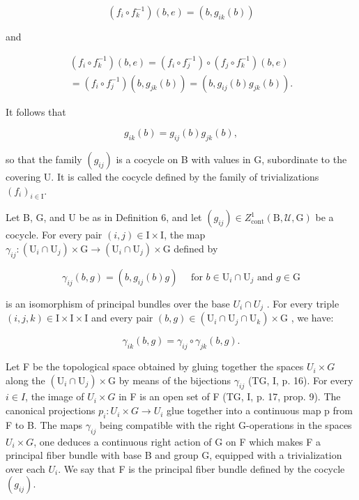 \[
(f _ {i} \circ f _ {k} ^ {- 1}) (b, e) = (b, g _ {i k} (b))
\]

and

\[
\begin{array}{c} (f _ {i} \circ f _ {k} ^ {- 1}) (b, e) = (f _ {i} \circ f _ {j} ^ {- 1}) \circ (f _ {j} \circ f _ {k} ^ {- 1}) (b, e) \\ = (f _ {i} \circ f _ {j} ^ {- 1}) (b, g _ {j k} (b)) = (b, g _ {i j} (b) g _ {j k} (b)). \end{array}
\]

It follows that

\[
g _ {i k} (b) = g _ {i j} (b) g _ {j k} (b),
\]

so that the family \((g_{ij})\) is a cocycle on B with values in G, subordinate to the covering U. It is called the cocycle defined by the family of trivializations \((f_{i})_{i\in\mathrm{I}}\).

Let B, G, and U be as in Definition 6, and let \((g_{ij}) \in Z_{\mathrm{cont}}^{1}(\mathrm{B}, \mathcal{U}, \mathrm{G})\) be a cocycle. For every pair \((i, j) \in \mathrm{I} \times \mathrm{I}\), the map \(\gamma_{ij} \colon (\mathrm{U}_{i} \cap \mathrm{U}_{j}) \times \mathrm{G} \to (\mathrm{U}_{i} \cap \mathrm{U}_{j}) \times \mathrm{G}\) defined by

\[
\gamma_ {i j} (b, g) = \left(b, g _ {i j} (b) g\right) \quad \text {   for   } b \in \mathrm{U} _ {i} \cap \mathrm{U} _ {j} \text {   and   } g \in \mathrm{G}\tag{5}
\]

is an isomorphism of principal bundles over the base \(U_{i} \cap U_{j}\) . For every triple \((i,j,k) \in \mathrm{I} \times \mathrm{I} \times \mathrm{I}\) and every pair \((b,g) \in (\mathrm{U}_{i} \cap \mathrm{U}_{j} \cap \mathrm{U}_{k}) \times \mathrm{G}\) , we have:

\[
\gamma_ {i k} (b, g) = \gamma_ {i j} \circ \gamma_ {j k} (b, g).
\]

Let F be the topological space obtained by gluing together the spaces \(U_{i} \times G\) along the \((\mathrm{U}_{i} \cap \mathrm{U}_{j}) \times \mathrm{G}\) by means of the bijections \(\gamma_{ij}\) (TG, I, p. 16). For every \(i \in I\), the image of \(U_{i} \times G\) in F is an open set of F (TG, I, p. 17, prop. 9). The canonical projections \(p_{i}: U_{i} \times G \to U_{i}\) glue together into a continuous map p from F to B. The maps \(\gamma_{ij}\) being compatible with the right G-operations in the spaces \(U_{i} \times G\), one deduces a continuous right action of G on F which makes F a principal fiber bundle with base B and group G, equipped with a trivialization over each \(U_{i}\). We say that F is the principal fiber bundle defined by the cocycle \((g_{ij})\).

